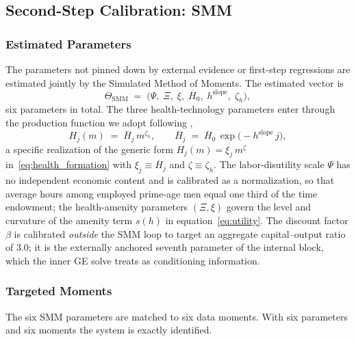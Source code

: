 \documentclass[12pt,a4paper]{article}
\begin{document}
\subsection{Second-Step Calibration: SMM}
\label{subsec:secondstep}

\subsubsection{Estimated Parameters}
\label{subsec:secondstep_smm}

The parameters not pinned down by external evidence or first-step regressions are estimated jointly by the Simulated Method of Moments. The estimated vector is
\[
\Theta_{\mathrm{SMM}} \;=\; \bigl(\Psi,\; \Xi,\; \xi,\; \overline{H}_0,\; h^{\mathrm{slope}},\; \zeta_h\bigr),
\]
six parameters in total. The three health-technology parameters enter through the production function we adopt following \citet{Carrasco2026},
\begin{equation}
\label{eq:healthproduction}
H_{j}(m) \;=\; \overline{H}_{j}\, m^{\zeta_{h}}, \qquad \overline{H}_{j} \;=\; \overline{H}_{0}\,\exp\bigl(-h^{\mathrm{slope}}\, j\bigr),
\end{equation}
a specific realization of the generic form $H_j(m)=\xi_j\, m^\zeta$ in~\eqref{eq:health_formation} with $\xi_j \equiv \overline{H}_j$ and $\zeta \equiv \zeta_h$. The labor-disutility scale $\Psi$ has no independent economic content and is calibrated as a normalization, so that average hours among employed prime-age men equal one third of the time endowment; the health-amenity parameters $(\Xi,\xi)$ govern the level and curvature of the amenity term $s(h)$ in equation~\eqref{eq:utility}. The discount factor $\beta$ is calibrated \emph{outside} the SMM loop to target an aggregate capital--output ratio of $3.0$; it is the externally anchored seventh parameter of the internal block, which the inner GE solve treats as conditioning information.

\subsubsection{Targeted Moments}

The six SMM parameters are matched to six data moments. With six parameters and six moments the system is exactly identified.
\end{document}
